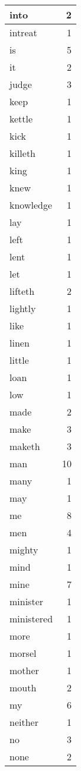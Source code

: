 \begin{center}
\begin{longtable}{l|r}
into & 2 \\ \hline
intreat & 1 \\ \hline
is & 5 \\ \hline
it & 2 \\ \hline
judge & 3 \\ \hline
keep & 1 \\ \hline
kettle & 1 \\ \hline
kick & 1 \\ \hline
killeth & 1 \\ \hline
king & 1 \\ \hline
knew & 1 \\ \hline
knowledge & 1 \\ \hline
lay & 1 \\ \hline
left & 1 \\ \hline
lent & 1 \\ \hline
let & 1 \\ \hline
lifteth & 2 \\ \hline
lightly & 1 \\ \hline
like & 1 \\ \hline
linen & 1 \\ \hline
little & 1 \\ \hline
loan & 1 \\ \hline
low & 1 \\ \hline
made & 2 \\ \hline
make & 3 \\ \hline
maketh & 3 \\ \hline
man & 10 \\ \hline
many & 1 \\ \hline
may & 1 \\ \hline
me & 8 \\ \hline
men & 4 \\ \hline
mighty & 1 \\ \hline
mind & 1 \\ \hline
mine & 7 \\ \hline
minister & 1 \\ \hline
ministered & 1 \\ \hline
more & 1 \\ \hline
morsel & 1 \\ \hline
mother & 1 \\ \hline
mouth & 2 \\ \hline
my & 6 \\ \hline
neither & 1 \\ \hline
no & 3 \\ \hline
none & 2 \\ \hline

\end{longtable}
\end{center}
